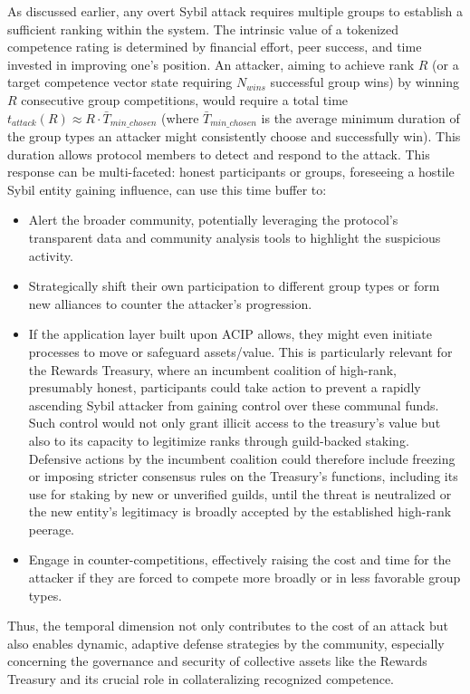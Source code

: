 \documentclass{article}
\begin{document}
\begin{CJK}{UTF8}{gbsn}
        As discussed earlier, any overt Sybil attack requires multiple groups to establish a sufficient ranking within the system. The intrinsic value of a tokenized competence rating is determined by financial effort, peer success, and time invested in improving one's position. An attacker, aiming to achieve rank $R$ {{ (or a target competence vector state requiring $N_{wins}$ successful group wins)}} by winning $R$ consecutive group competitions, would require a total time $t_{attack}(R) \approx R \cdot \bar{T}_{min\_chosen}$ (where $\bar{T}_{min\_chosen}$ is the average minimum duration of the group types an attacker might consistently choose and successfully win). This duration allows protocol members to detect and respond to the attack. This response can be multi-faceted: honest participants or groups, foreseeing a hostile Sybil entity gaining influence, can use this time buffer to:
        \begin{itemize}[nosep]
            \item Alert the broader community, potentially leveraging {{the protocol's transparent data and community analysis tools}} to highlight the suspicious activity.
            \item Strategically shift their own participation to different group types or form new alliances to counter the attacker's progression.
            \item If the application layer built upon ACIP allows, they might even initiate processes to move or safeguard assets/value. This is particularly relevant for the Rewards Treasury, where an incumbent coalition of high-rank, presumably honest, participants could take action to prevent a rapidly ascending Sybil attacker from gaining control over these communal funds. Such control would not only grant illicit access to the treasury's value but also to its capacity to legitimize ranks through guild-backed staking. Defensive actions by the incumbent coalition could therefore include freezing or imposing stricter consensus rules on the Treasury's functions, including its use for staking by new or unverified guilds, until the threat is neutralized or the new entity's legitimacy is broadly accepted by the established high-rank peerage.
            \item Engage in counter-competitions, effectively raising the cost and time for the attacker if they are forced to compete more broadly or in less favorable group types.
        \end{itemize}
        Thus, the temporal dimension not only contributes to the cost of an attack but also enables dynamic, adaptive defense strategies by the community, especially concerning the governance and security of collective assets like the Rewards Treasury and its crucial role in collateralizing recognized competence.


\end{CJK}
\end{document}
